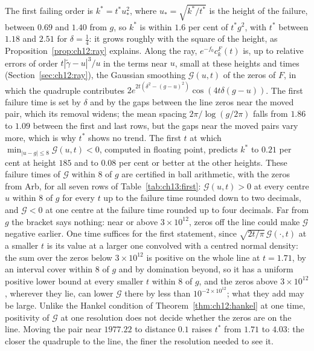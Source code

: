 The first failing order is $k^*=t^*u_*^2$, where $u_*=\sqrt{k^*/t^*}$ is the height of the failure, between $0.69$ and $1.40$ from $g$, so $k^*$ is within $1.6$ per cent of $t^*g^2$, with $t^*$ between $1.18$ and $2.51$ for $\delta=\frac14$: it grows roughly with the square of the height, as Proposition~\ref{prop:ch12:ray} explains. Along the ray, $e^{-f_0}c_k^F(t)$ is, up to relative errors of order $t|\tilde\gamma-u|^3/u$ in the terms near $u$, small at these heights and times (Section~\ref{sec:ch12:ray}), the Gaussian smoothing $\mathcal G(u,t)$ of the zeros of $F$, in which the quadruple contributes $2e^{2t(\delta^2-(g-u)^2)}\cos(4t\delta(g-u))$. The first failure time is set by $\delta$ and by the gaps between the line zeros near the moved pair, which its removal widens; the mean spacing $2\pi/\log(g/2\pi)$ falls from $1.86$ to $1.09$ between the first and last rows, but the gaps near the moved pairs vary more, which is why $t^*$ shows no trend. The first $t$ at which $\min_{|u-g|\le8}\mathcal G(u,t)<0$, computed in floating point, predicts $k^*$ to $0.21$ per cent at height $185$ and to $0.08$ per cent or better at the other heights. These failure times of $\mathcal G$ within $8$ of $g$ are certified in ball arithmetic, with the zeros from Arb, for all seven rows of Table~\ref{tab:ch13:first}: $\mathcal G(u,t)>0$ at every centre $u$ within $8$ of $g$ for every $t$ up to the failure time rounded down to two decimals, and $\mathcal G<0$ at one centre at the failure time rounded up to four decimals. Far from $g$ the bracket says nothing: near or above $3\times10^{12}$, zeros off the line could make $\mathcal G$ negative earlier. One time suffices for the first statement, since $\sqrt{2t/\pi}\,\mathcal G(\cdot,t)$ at a smaller $t$ is its value at a larger one convolved with a centred normal density: the sum over the zeros below $3\times10^{12}$ is positive on the whole line at $t=1.71$, by an interval cover within $8$ of $g$ and by domination beyond, so it has a uniform positive lower bound at every smaller $t$ within $8$ of $g$, and the zeros above $3\times10^{12}$, wherever they lie, can lower $\mathcal G$ there by less than $10^{-2\times10^{12}}$; what they add may be large. Unlike the Hankel condition of Theorem~\ref{thm:ch12:hankel} at one time, positivity of $\mathcal G$ at one resolution does not decide whether the zeros are on the line. Moving the pair near $1977.22$ to distance $0.1$ raises $t^*$ from $1.71$ to $4.03$: the closer the quadruple to the line, the finer the resolution needed to see it.

